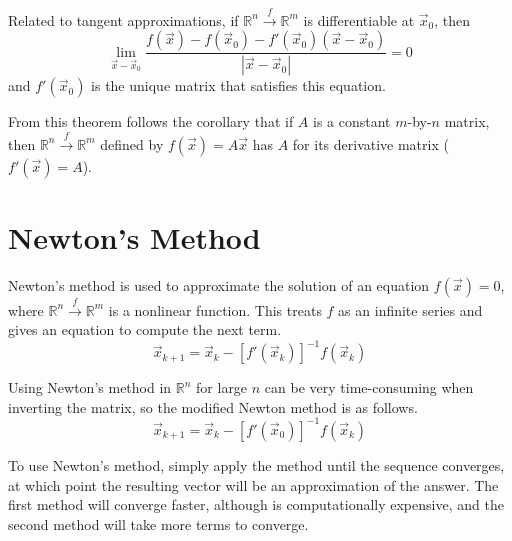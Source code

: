 \documentclass[11pt]{article}
\begin{document}
		Related to tangent approximations, if $\mathbb{R}^n \xrightarrow{f} \mathbb{R}^m$ is differentiable at $\vec{x}_0$, then 
		\begin{equation}
			\lim_{\vec{x} - \vec{x}_0} \frac{f(\vec{x}) - f(\vec{x}_0) - f'(\vec{x}_0)(\vec{x} - \vec{x}_0)}{|\vec{x} - \vec{x}_0|} = 0
		\end{equation}
		and $f'(\vec{x}_0)$ is the unique matrix that satisfies this equation. 
		
		From this theorem follows the corollary that if $A$ is a constant $m$-by-$n$ matrix, then $\mathbb{R}^n \xrightarrow{f} \mathbb{R}^m$ defined by $f(\vec{x}) = A\vec{x}$ has $A$ for its derivative matrix ($f'(\vec{x}) = A$).
		
\section{Newton's Method}
	Newton's method is used to approximate the solution of an equation $f(\vec{x}) = 0$, where $\mathbb{R}^n \xrightarrow{f} \mathbb{R}^m$ is a nonlinear function. This treats $f$ as an infinite series and gives an equation to compute the next term.
	\begin{equation}
		\vec{x}_{k+1} = \vec{x}_k - [f'(\vec{x}_k)]^{-1} f(\vec{x}_k)
	\end{equation}
	
	Using Newton's method in $\mathbb{R}^n$ for large $n$ can be very time-consuming when inverting the matrix, so the modified Newton method is as follows.
	\begin{equation}
		\vec{x}_{k+1} = \vec{x}_k - [f'(\vec{x}_0)]^{-1} f(\vec{x}_k)
	\end{equation}
	
	To use Newton's method, simply apply the method until the sequence converges, at which point the resulting vector will be an approximation of the answer. The first method will converge faster, although is computationally expensive, and the second method will take more terms to converge.
	
\end{document}
